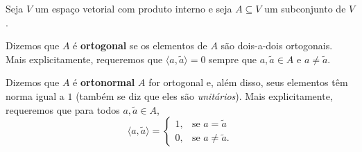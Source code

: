 \begin{definition}
	Seja $V$ um espaço vetorial com produto interno e seja $A\subseteq V$ um subconjunto de $V$.
	
	Dizemos que $A$ é \textbf{ortogonal} se os elementos de $A$ são dois-a-dois ortogonais. Mais explicitamente, requeremos que $\langle a,\widetilde{a}\rangle=0$ sempre que $a,\widetilde{a}\in A$ e $a\neq\widetilde{a}$.
	
	Dizemos que $A$ é \textbf{ortonormal} $A$ for ortogonal e, além disso, seus elementos têm norma igual a $1$ (também se diz que eles são \textit{unitários}). Mais explicitamente, requeremos que para todos $a,\widetilde{a}\in A$,
	\[\langle a,\widetilde{a}\rangle=\begin{cases}1, &\text{se }a=\widetilde{a}\\0,&\text{se }a\neq \widetilde{a}.\end{cases}\]
\end{definition}